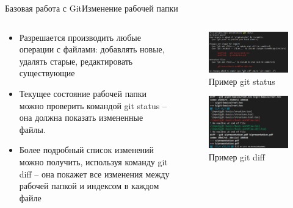 \begin{frame}{Базовая работа с Git}{Изменение рабочей папки}
    \begin{columns}
        \begin{column}{0.6\textwidth}
            \begin{itemize}
                \item
                      Разрешается производить любые операции с файлами: добавлять новые, удалять старые, редактировать существующие
                \item
                      Текущее состояние рабочей папки можно проверить командой git status -- она должна показать измененные файлы.
                \item
                      Более подробный список изменений можно получить, используя команду git diff -- она покажет все изменения между рабочей папкой и индексом в каждом файле
            \end{itemize}
        \end{column}
        \begin{column}{0.4\textwidth}
            \begin{figure}
                \centering
                \includegraphics[width=\textwidth]{images/git-status-example.png}
                \caption{Пример git status}
            \end{figure}
            \begin{figure}
                \centering
                \includegraphics[width=\textwidth]{images/git-diff-example.png}
                \caption{Пример git diff}
            \end{figure}
        \end{column}
    \end{columns}

\end{frame}